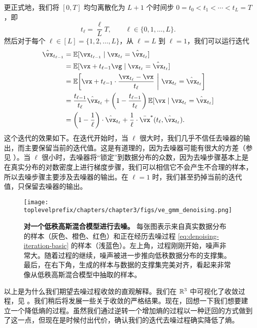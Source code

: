 \documentclass[../../book-main_zh.tex]{subfiles}
\begin{document}
更正式地，我们将 \([0, T]\) 均匀离散化为 \(L + 1\) 个时间步 \(0 = t_{0} < t_{1} < \cdots < t_{L} = T\)，即
\begin{equation}
	t_{\ell} = \frac{\ell}{L}T, \qquad \ell \in \{0, 1, \dots, L\}.
\end{equation}
然后对于每个 \(\ell \in [L] = \{1, 2, \dots, L\}\)，从 \(\ell = L\) 到 \(\ell = 1\)，我们可以运行迭代
\begin{align}
	\hat{\vx}_{t_{\ell - 1}}
	&= \Ex[\vx_{t_{\ell - 1}} \mid \vx_{t_{\ell}} = \hat{\vx}_{t_{\ell}}] \\
	&= \Ex[\vx + t_{\ell - 1}\vg \mid \vx_{t_{\ell}} = \hat{\vx}_{t_{\ell}}] \\
	&= \Ex\rs{\vx + t_{\ell - 1}\cdot\frac{\vx_{t_{\ell}} - \vx}{t_{\ell}} \given \vx_{t_{\ell}} = \hat{\vx}_{t_{\ell}}} \\
	&= \frac{t_{\ell - 1}}{t_{\ell}}\hat{\vx}_{t_{\ell}} + \bp{1 - \frac{t_{\ell - 1}}{t_{\ell}}}\Ex[\vx \mid \vx_{t_{\ell}} = \hat{\vx}_{t_{\ell}}] \\
	&= \bp{1 - \frac{1}{\ell}}\cdot\hat{\vx}_{t_{\ell}} + \frac{1}{\ell}\cdot\bar{\vx}^{\ast}(t_{\ell}, \hat{\vx}_{t_{\ell}}).
\end{align}
这个迭代的效果如下。在迭代开始时，当 \(\ell\) 很大时，我们几乎不信任去噪器的输出，而主要保留当前的迭代值。这是有道理的，因为去噪器可能有很大的方差（参见 ）。当 \(\ell\) 很小时，去噪器将“锁定”到数据分布的众数，因为去噪步骤基本上是在真实分布的对数密度上进行梯度步骤，我们可以相信它不会产生不合理的样本，所以去噪步骤主要涉及去噪器的输出。在 \(\ell = 1\) 时，我们甚至扔掉当前的迭代值，只保留去噪器的输出。

\begin{figure}[t]
	\centering
	\texttt{[image: \\toplevelprefix/chapters/chapter3/figs/ve\_gmm\_denoising.png]}
	\caption{\small\textbf{对一个低秩高斯混合模型进行去噪。} 每张图表示来自真实数据分布的样本（灰色、橙色、红色）和正在经历去噪过程 \eqref{eq:denoising-iteration-basic} 的样本（浅蓝色）。左上角，过程刚刚开始，噪声非常大。随着过程的继续，噪声被进一步推向低秩数据分布的支撑集。最后，在右下角，生成的样本与数据的支撑集完美对齐，看起来非常像从低秩高斯混合模型中抽取的样本。}
	\label{fig:ve_gmm_denoising}
\end{figure}

以上是为什么我们期望去噪过程收敛的直观解释。我们在 \(\mathbb{R}^{3}\) 中可视化了收敛过程，见 。我们稍后将发展一些关于收敛的严格结果。现在，回想一下我们想要建立一个降低熵的过程。虽然我们通过逆转一个增加熵的过程以一种迂回的方式做到了这一点，但现在是时候付出代价，确认我们的迭代去噪过程确实降低了熵。
\end{document}
